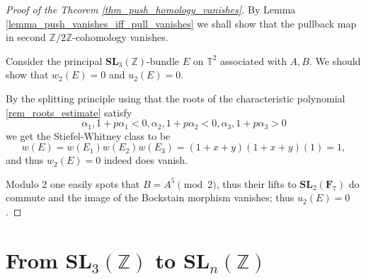 \documentclass[a4paper]{article}
\newcommand{\SL}{\mathbf{SL}_3(\mathbb{Z})}        %
\newcommand{\SLn}{\mathbf{SL}_n(\mathbb{Z})}        %
\begin{document}
\begin{proof}[Proof of the Theorem \ref{thm_push_homology_vanishes}]
By Lemma \ref{lemma_push_vanishes_iff_pull_vanishes} we shall show that the pullback map in second $\mathbb{Z}/ 2 \mathbb{Z}$-cohomology vanishes.

Consider the principal $\SL$-bundle $E$ on $\mathbb{T}^2$ associated with $A, B$.
We should show that $w_2(E) = 0$ and $u_2(E) = 0$.

By the splitting principle
using that the roots of the characteristic polynomial 
\ref{rem_roots_estimate} 
satisfy \[
\alpha_1, 1 + p \alpha_1 < 0, 
\alpha_2, 1 + p \alpha_2 < 0, 
\alpha_3, 1 + p \alpha_3 > 0 
\] 
we get the Stiefel-Whitney class to be
\[
w(E) = w(E_1) w(E_2) w (E_3)
= (1 + x + y) (1 + x + y) (1) 
= 1
,\]
and thus $w_2(E) = 0$ indeed does vanish.

Modulo $2$ one easily spots that $B = A^5 \pmod{2}$, thus their lifts to $\mathbf{SL}_2(\mathbf{F}_7)$ do commute and the image of the Bockstain morphism vanishes; thus $u_2(E) = 0$.
\end{proof}



\newpage
\section{From $\SL$ to $\SLn$}
\end{document}
